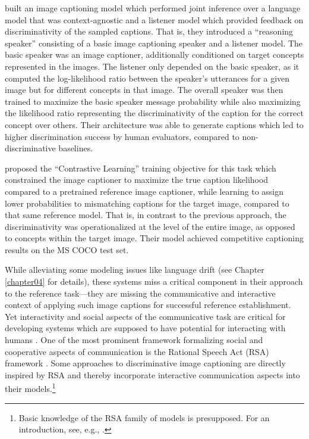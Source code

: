 \cite{vedantam2017context} built an image captioning model which performed joint inference over a language model that was context-agnostic and a listener model which provided feedback on discriminativity of the sampled captions. That is, they introduced a ``reasoning speaker'' consisting of a basic image captioning speaker and a listener model. The basic speaker was an image captioner, additionally conditioned on target concepts represented in the images. The listener only depended on the basic speaker, as it computed the log-likelihood ratio between the speaker's utterances for a given image but for different concepts in that image. The overall speaker was then trained to maximize the basic speaker message probability while also maximizing the likelihood ratio representing the discriminativity of the caption for the correct concept over others.
Their architecture was able to generate captions which led to higher discrimination success by human evaluators, compared to non-discriminative baselines.

\cite{dai2017contrastive} proposed the ``Contrastive Learning'' training objective for this task which constrained the image captioner to maximize the true caption likelihood compared to a pretrained reference image captioner, while learning to assign lower probabilities to mismatching captions for the target image, compared to that same reference model. That is, in contrast to the previous approach, the discriminativity was operationalized at the level of the entire image, as opposed to concepts within the target image. %
Their model achieved competitive captioning results on the MS COCO test set.

While alleviating some modeling issues like language drift (see Chapter \ref{chapter04} for details), these systems miss a critical component in their approach to the reference task---they are missing the communicative and interactive context of applying such image captions for successful reference establishment. Yet interactivity and social aspects of the communicative task are critical for developing systems which are supposed to have potential for interacting with humans \parencite{lazaridou2020emergent}. One of the most prominent framework formalizing social and cooperative aspects of communication is the Rational Speech Act (RSA) framework \parencite{goodman2016pragmatic}. Some approaches to discriminative image captioning are directly inspired by RSA and thereby incorporate interactive communication aspects into their models.\footnote{Basic knowledge of the RSA family of models is presupposed. For an introduction, see, e.g., \cite{goodman2016pragmatic, problang}.}


